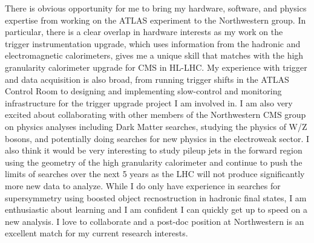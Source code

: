 

There is obvious opportunity for me to bring my hardware, software, and physics expertise from working on the ATLAS experiment to the Northwestern group. In particular, there is a clear overlap in hardware interests as my work on the trigger instrumentation upgrade, which uses information from the hadronic and electromagnetic calorimeters, gives me a unique skill that matches with the high granularity calorimeter upgrade for CMS in HL-LHC. My experience with trigger and data acquisition is also broad, from running trigger shifts in the ATLAS Control Room to designing and implementing slow-control and monitoring infrastructure for the trigger upgrade project I am involved in. I am also very excited about collaborating with other members of the Northwestern CMS group on physics analyses including Dark Matter searches, studying the physics of W/Z bosons, and potentially doing searches for new physics in the electroweak sector. I also think it would be very interesting to study pileup jets in the forward region using the geometry of the high granularity calorimeter and continue to push the limits of searches over the next 5 years as the LHC will not produce significantly more new data to analyze. While I do only have experience in searches for supersymmetry using boosted object recnostruction in hadronic final states, I am enthusiastic about learning and I am confident I can quickly get up to speed on a new analysis. I love to collaborate and a post-doc position at Northwestern is an excellent match for my current research interests.



